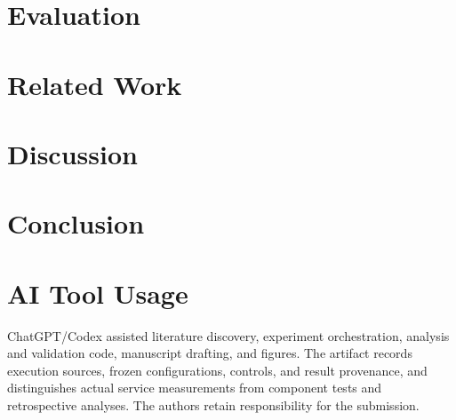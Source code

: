 \documentclass[conference,10pt]{IEEEtran}
\begin{document}
\section{Evaluation}\label{sec:eval}



\section{Related Work}\label{sec:related}

\section{Discussion}\label{sec:discussion}

\section{Conclusion}\label{sec:conclusion}

\section*{AI Tool Usage}
ChatGPT/Codex assisted literature discovery, experiment orchestration,
analysis and validation code, manuscript drafting, and figures. The artifact
records execution sources, frozen configurations, controls, and result
provenance, and distinguishes actual service measurements from component
tests and retrospective analyses. The authors retain responsibility for the
submission.
\clearpage


\end{document}

